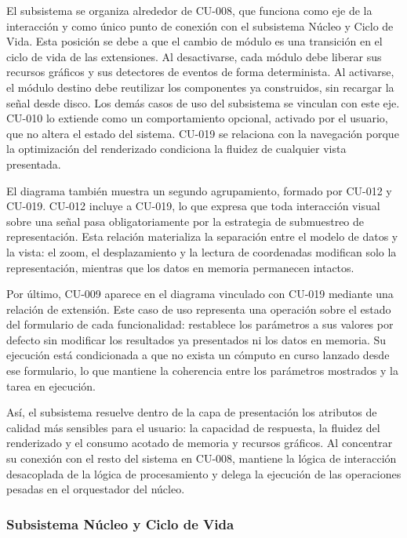 \documentclass[11pt,a4paper]{article}
\DeclareRobustCommand{\_}{\textunderscore\allowbreak}
\begin{document}
El subsistema se organiza alrededor de CU-008, que funciona como eje de la interacci\'on y como \'unico punto de conexi\'on con el subsistema N\'ucleo y Ciclo de Vida. Esta posici\'on se debe a que el cambio de m\'odulo es una transici\'on en el ciclo de vida de las extensiones. Al desactivarse, cada m\'odulo debe liberar sus recursos gr\'aficos y sus detectores de eventos de forma determinista. Al activarse, el m\'odulo destino debe reutilizar los componentes ya construidos, sin recargar la se\~nal desde disco. Los dem\'as casos de uso del subsistema se vinculan con este eje. CU-010 lo extiende como un comportamiento opcional, activado por el usuario, que no altera el estado del sistema. CU-019 se relaciona con la navegaci\'on porque la optimizaci\'on del renderizado condiciona la fluidez de cualquier vista presentada.

El diagrama tambi\'en muestra un segundo agrupamiento, formado por CU-012 y CU-019. CU-012 incluye a CU-019, lo que expresa que toda interacci\'on visual sobre una se\~nal pasa obligatoriamente por la estrategia de submuestreo de representaci\'on. Esta relaci\'on materializa la separaci\'on entre el modelo de datos y la vista: el zoom, el desplazamiento y la lectura de coordenadas modifican solo la representaci\'on, mientras que los datos en memoria permanecen intactos.

Por \'ultimo, CU-009 aparece en el diagrama vinculado con CU-019 mediante una relaci\'on de extensi\'on. Este caso de uso representa una operaci\'on sobre el estado del formulario de cada funcionalidad: restablece los par\'ametros a sus valores por defecto sin modificar los resultados ya presentados ni los datos en memoria. Su ejecuci\'on est\'a condicionada a que no exista un c\'omputo en curso lanzado desde ese formulario, lo que mantiene la coherencia entre los par\'ametros mostrados y la tarea en ejecuci\'on.

Así, el subsistema resuelve dentro de la capa de presentaci\'on los atributos de calidad m\'as sensibles para el usuario: la capacidad de respuesta, la fluidez del renderizado y el consumo acotado de memoria y recursos gr\'aficos. Al concentrar su conexi\'on con el resto del sistema en CU-008, mantiene la l\'ogica de interacci\'on desacoplada de la l\'ogica de procesamiento y delega la ejecuci\'on de las operaciones pesadas en el orquestador del n\'ucleo.

\subsubsection{Subsistema N\'ucleo y Ciclo de Vida}
\end{document}

